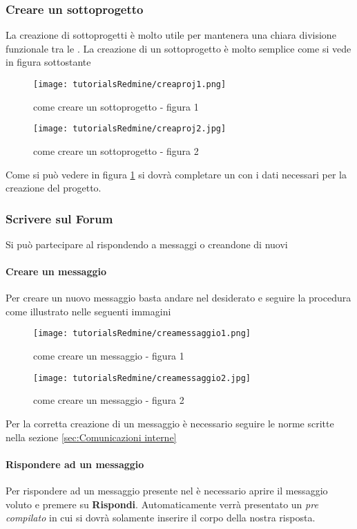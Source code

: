 \documentclass{scalatekids-article}
\begin{document}
\subsubsection{Creare un sottoprogetto}
La creazione di sottoprogetti è molto utile per mantenera una chiara divisione funzionale tra le . La creazione di un sottoprogetto è molto semplice come si vede in figura sottostante
\begin{figure}[H]
  \centering
  \texttt{[image: tutorialsRedmine/creaproj1.png]}
  \caption{come creare un sottoprogetto - figura 1}
\end{figure}
\begin{figure}[H]
  \centering
  \texttt{[image: tutorialsRedmine/creaproj2.jpg]}
  \caption{come creare un sottoprogetto - figura 2\label{fig:figura-2}}
\end{figure}
Come si può vedere in figura \ref{fig:figura-2} si dovrà completare un  con i dati necessari per la creazione del progetto.
\subsubsection{Scrivere sul Forum}
Si può partecipare al  rispondendo a messaggi o creandone di nuovi
\paragraph{Creare un messaggio}
Per creare un nuovo messaggio basta andare nel  desiderato e seguire la procedura come illustrato nelle seguenti immagini
\begin{figure}[H]
  \centering
  \texttt{[image: tutorialsRedmine/creamessaggio1.png]}
  \caption{come creare un messaggio - figura 1}
\end{figure}
\begin{figure}[H]
  \centering
  \texttt{[image: tutorialsRedmine/creamessaggio2.jpg]}
  \caption{come creare un messaggio - figura 2}
\end{figure}
Per la corretta creazione di un messaggio è necessario seguire le norme scritte nella sezione \ref{sec:Comunicazioni interne}
\paragraph{Rispondere ad un messaggio}
Per rispondere ad un messaggio presente nel  è necessario aprire il messaggio voluto e premere su \textbf{Rispondi}. Automaticamente verrà presentato un  \textit{pre compilato} in cui si dovrà solamente inserire il corpo della nostra risposta.
\end{document}

